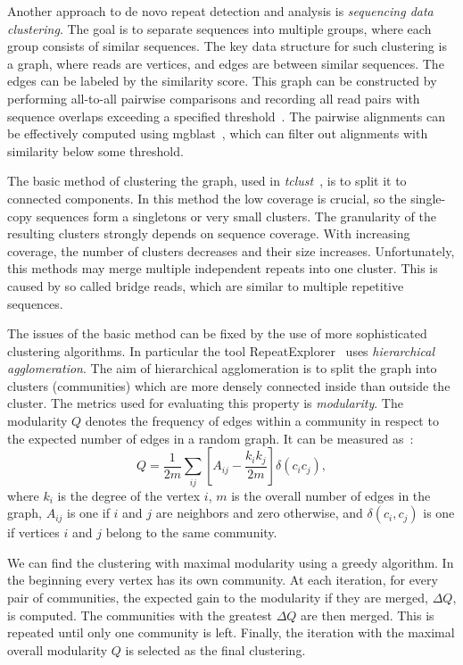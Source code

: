 Another approach to de novo repeat detection and analysis is \emph{sequencing data clustering}. The goal is to separate sequences into multiple groups, where each group consists of similar sequences.
The key data structure for such clustering is a graph, where reads are vertices, and edges are between similar sequences. The edges can be labeled by the similarity score. This graph can be constructed by performing all-to-all pairwise comparisons and recording all read pairs with sequence overlaps exceeding a specified threshold~\cite{pertea2003tigr, novak2010graph}. The pairwise alignments can be effectively computed using mgblast~\cite{pertea2003tigr}, which can filter out alignments with similarity below some threshold.

The basic method of clustering the graph, used in \emph{tclust}~\cite{pertea2003tigr}, is to split it to connected components.
In this method the low coverage is crucial, so the single-copy sequences form a singletons or very small clusters.
The granularity of the resulting clusters strongly depends on sequence coverage.
With increasing coverage, the number of clusters decreases and their size increases.
Unfortunately, this methods may merge multiple independent repeats into one cluster. This is caused by so called bridge reads, which are similar to multiple repetitive sequences.

The issues of the basic method can be fixed by the use of more sophisticated clustering algorithms. In particular the tool RepeatExplorer~\cite{novak2010graph} uses \emph{hierarchical agglomeration}. The aim of hierarchical agglomeration is to split the graph into clusters (communities) which are more densely connected inside than outside the cluster. The metrics used for evaluating this property is \emph{modularity}.
The modularity $Q$ denotes the frequency of edges within a community in respect to the expected number of edges in a random graph. It can be measured as~\cite{novak2010graph}:
$$Q = \frac{1}{2m}\sum_{ij}\left[A_{ij}-\frac{k_i k_j}{2m}\right] \delta(c_i c_j),$$
where $k_i$ is the degree of the vertex $i$, $m$ is the overall number of edges in the graph, $A_{ij}$ is one if $i$ and $j$ are neighbors and zero otherwise, and $\delta(c_i, c_j)$ is one if vertices $i$ and $j$ belong to the same community.

We can find the clustering with maximal modularity using a greedy algorithm. In the beginning every vertex has its own community.
At each iteration, for every pair of communities, the expected gain to the modularity if they are merged, $\Delta Q$, is computed. The communities with the greatest $\Delta Q$ are then merged. This is repeated until only one community is left. Finally, the iteration with the maximal overall modularity $Q$ is selected as the final clustering.

